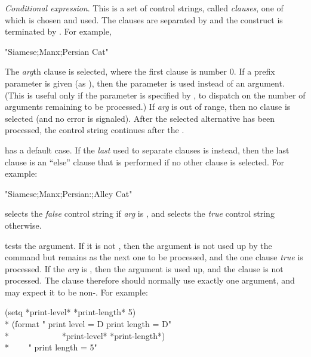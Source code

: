 \begin{flushdesc}
\item[\cd{{\Xtilde}{\Xlbracket}{\it str0}{\Xtilde};{\it str1}{\Xtilde};{\it ...}{\Xtilde};{\it strn}{\Xtilde}{\Xrbracket}}]
{\it Conditional expression}.
This is a set of control strings, called {\it clauses}, one of which is
chosen and used.  The clauses are separated by \cd{{\Xtilde};} and the construct
is terminated by \cd{{\Xtilde}{\Xrbracket}}.  For example,
\begin{lisp}
"{\Xtilde}{\Xlbracket}Siamese{\Xtilde};Manx{\Xtilde};Persian{\Xtilde}{\Xrbracket} Cat"
\end{lisp}
The {\it arg}th
clause is selected, where the first clause is number 0.
If a prefix parameter is given (as ),
then the parameter is used instead of an argument.
(This is useful only if the parameter is specified by \cd{\#},
to dispatch on the number of arguments remaining to be processed.)
If {\it arg} is out of range, then no clause is selected
(and no error is signaled).
After the selected alternative has been processed, the control string
continues after the \cd{{\Xtilde}{\Xrbracket}}.

 has a default case.
If the {\it last} \cd{{\Xtilde};} used to separate clauses
is \cd{{\Xtilde}:;} instead, then the last clause is an ``else'' clause
that is performed if no other clause is selected.
For example:
\begin{lisp}
"{\Xtilde}{\Xlbracket}Siamese{\Xtilde};Manx{\Xtilde};Persian{\Xtilde}:;Alley{\Xtilde}{\Xrbracket} Cat"
\end{lisp}

 selects the {\it false} control string
if {\it arg} is {\false}, and selects the {\it true} control string otherwise.

 tests the argument.  If it is not {\false},
then the argument is not used up by the \cd{{\Xtilde}{\Xatsign}{\Xlbracket}} command
but remains as the next one to be processed,
and the one clause {\it true} is processed.
If the {\it arg} is {\false}, then the argument is used up,
and the clause is not processed.
The clause therefore should normally use exactly one argument,
and may expect it to be non-{\false}.
For example:
\begin{lisp}
(setq *print-level* {\false} *print-length* 5) \\*
(format {\false} "{\Xtilde}{\Xatsign}{\Xlbracket} print level = {\Xtilde}D{\Xtilde}{\Xrbracket}{\Xtilde}{\Xatsign}{\Xlbracket} print length = {\Xtilde}D{\Xtilde}{\Xrbracket}" \\*
~~~~~~~~~~~~*print-level* *print-length*) \\*
~~~\EV\  " print length = 5"
\end{lisp}


\end{flushdesc}
